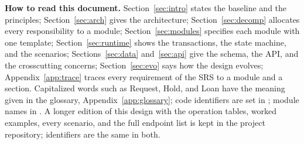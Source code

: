 \noindent\textbf{How to read this document.} Section~\ref{sec:intro} states the baseline and the principles; Section~\ref{sec:arch} gives the architecture; Section~\ref{sec:decomp} allocates every responsibility to a module; Section~\ref{sec:modules} specifies each module with one template; Section~\ref{sec:runtime} shows the transactions, the state machine, and the scenarios; Sections~\ref{sec:data} and~\ref{sec:api} give the schema, the API, and the crosscutting concerns; Section~\ref{sec:evo} says how the design evolves; Appendix~\ref{app:trace} traces every requirement of the SRS to a module and a section. Capitalized words such as Request, Hold, and Loan have the meaning given in the glossary, Appendix~\ref{app:glossary}; code identifiers are set in ; module names in . A longer edition of this design with the operation tables, worked examples, every scenario, and the full endpoint list is kept in the project repository; identifiers are the same in both.

\tableofcontents
\listoffigures
\clearpage
